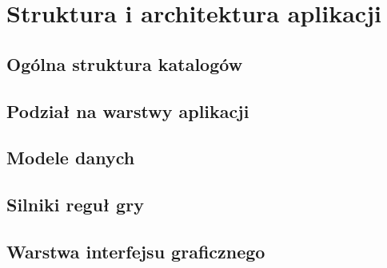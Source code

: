 \chapter{Struktura i architektura aplikacji}

\section{Ogólna struktura katalogów}

\section{Podział na warstwy aplikacji}

\section{Modele danych}

\section{Silniki reguł gry}

\section{Warstwa interfejsu graficznego}
